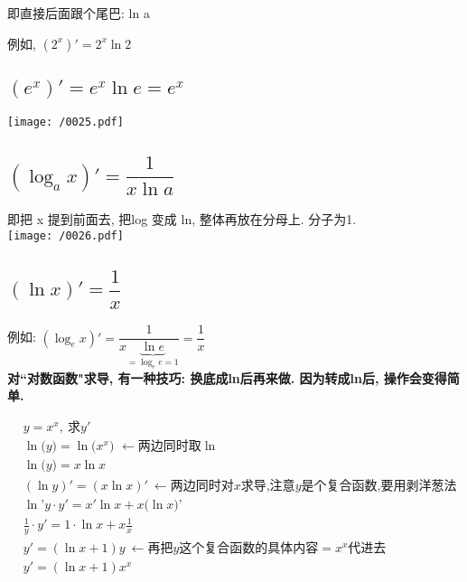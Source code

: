 \documentclass[UTF8]{ctexart}
\begin{document}
即直接后面跟个尾巴: ln a

例如, $(2^x)' = 2^x \ln 2$




\subsection{$(e^x)' = e^x \ln e = e^x$}

\texttt{[image: /0025.pdf]}




\subsection{$(\log_a x)' = \dfrac{1} {x \ln a}$}

即把 x 提到前面去, 把log 变成 ln, 整体再放在分母上. 分子为1. \\

\texttt{[image: /0026.pdf]}



\subsection{$(\ln x)' = \dfrac{1} {x}$}

例如: 
$\left( \log _ex \right) '=\dfrac{1}{x\underset{=\log _ee=1}{\underbrace{\ln e}}}=\dfrac{1}{x}$ \\


\textbf{对``对数函数"求导, 有一种技巧: 换底成ln后再来做. 因为转成ln后, 操作会变得简单.} \\

\begin{myEnvSample}
	\begin{align*}
	&y=x^x,\ \text{求}y'\\
&\ln\text{(}y\text{)}=\ln\text{(}x^x\text{)\ }\gets \text{两边同时取}\ln\\
&\ln\text{(}y\text{)}=x\ln x\\
&\left( \ln y \right) '=\left( x\ln x \right) '\ \gets \text{两边同时对}x\text{求导,注意}y\text{是个复合函数,要用剥洋葱法}\\
&\ln\text{'}y\cdot y'=x'\ln x+x\text{(}\ln x\text{)'}\\
&\frac{1}{y}\cdot y'=1\cdot \ln x+x\frac{1}{x}\\
&y'=\left( \ln x+1 \right) y\ \gets \text{再把}y\text{这个复合函数的具体内容}=x^x\text{代进去}\\
&y'=\left( \ln x+1 \right) x^x
	\end{align*}
\end{myEnvSample}
\end{document}

